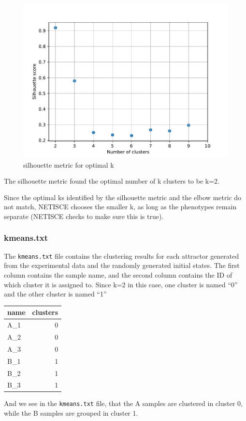 \documentclass[
]{book}
\begin{document}
\begin{figure}

{\centering \includegraphics[width=0.5\linewidth]{results/silhouette} 

}

\caption{silhouette metric for optimal k}\label{fig:unnamed-chunk-12}
\end{figure}

The silhouette metric found the optimal number of k clusters to be k=2.

Since the optimal ks identified by the silhouette metric and the elbow metric do not match, NETISCE chooses the smaller k, as long as the phenotypes remain separate (NETISCE checks to make sure this is true).

\hypertarget{section-id}{%
\subsubsection*{kmeans.txt}\label{section-id}}

The \texttt{kmeans.txt} file contains the clustering results for each attractor generated from the experimental data and the randomly generated initial states. The first column contains the sample name, and the second column contains the ID of which cluster it is assigned to. Since k=2 in this case, one cluster is named
``0'' and the other cluster is named ``1''

\begin{tabular}{l|r}
\hline
name & clusters\\
\hline
A\_1 & 0\\
\hline
A\_2 & 0\\
\hline
A\_3 & 0\\
\hline
B\_1 & 1\\
\hline
B\_2 & 1\\
\hline
B\_3 & 1\\
\hline
\end{tabular}

And we see in the \texttt{kmeans.txt} file, that the A samples are clustered in cluster 0, while the B samples are grouped in cluster 1.
\end{document}
